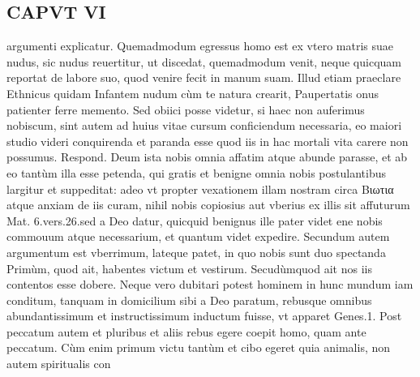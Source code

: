 \documentclass{article}
\begin{document}
\begin{pages}
\section*{CAPVT  VI }
\marginpar{[ p.444 ]}\pstart argumenti explicatur. Quemadmodum egressus homo est ex vtero matris suae nudus, sic nudus reuertitur, ut discedat, quemadmodum venit, neque quicquam reportat de labore suo, quod venire fecit in manum suam. Illud etiam praeclare Ethnicus quidam Infantem nudum cùm te natura crearit, Paupertatis onus patienter ferre memento.  \pend\pstart Sed obiici posse videtur, si haec non auferimus nobiscum, sint autem ad huius vitae cursum conficiendum necessaria, eo maiori studio videri conquirenda et paranda esse quod iis in hac mortali vita carere non possumus. Respond. Deum ista nobis omnia affatim atque abunde parasse, et ab eo tantùm illa esse petenda, qui gratis et benigne omnia nobis postulantibus largitur et suppeditat: adeo vt propter vexationem illam nostram circa Βιωτια atque anxiam de iis curam, nihil nobis copiosius aut vberius ex illis sit affuturum Mat. 6.vers.26.sed a Deo datur, quicquid benignus ille pater videt ene nobis commouum atque necessarium, et quantum videt expedire.  \pend\pstart Secundum autem argumentum est vberrimum, lateque patet, in quo nobis sunt duo spectanda Primùm, quod ait, habentes victum et vestirum. Secudùmquod ait nos iis contentos esse dobere.  \pend\pstart Neque vero dubitari potest hominem in hunc mundum iam conditum, tanquam in domicilium sibi a Deo paratum, rebusque omnibus abundantissimum et instructissimum inductum fuisse, vt apparet Genes.1. Post peccatum autem et pluribus et aliis rebus egere coepit homo, quam ante peccatum. Cùm enim primum victu tantùm et cibo egeret quia animalis, non autem spiritualis con\pend

\end{pages}
\end{document}
